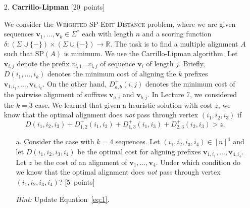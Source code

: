 \begin{enumerate}
\item[2.] \textbf{Carrillo-Lipman} [20~points]

We consider the \textsc{Weighted SP-Edit Distance} problem, where we are given sequences $\mathbf{v}_1,\ldots,\mathbf{v}_k \in \Sigma^*$ each with length $n$ and a scoring function $\delta : (\Sigma \cup \{-\}) \times (\Sigma \cup \{-\}) \rightarrow \mathbb{R}$. 
The task is to find a multiple alignment $A$ such that $\mathrm{SP}(A)$ is minimum.
We use the Carrillo-Lipman algorithm. 
Let $\mathbf{v}_{i,j}$ denote the prefix $v_{i,1}\ldots v_{i,j}$ of sequence $\mathbf{v}_i$ of length $j$.
Briefly, $D(i_1,\ldots,i_k)$ denotes the minimum cost of aligning the $k$ prefixes $\mathbf{v}_{1,i_1},\ldots,\mathbf{v}_{k,i_k}$. 
On the other hand, $D^+_{a,b}(i,j)$ denotes the minimum cost of the pairwise alignment of suffixes $\mathbf{v}_{a,i}$ and $\mathbf{v}_{b,j}$.
In Lecture 7, we considered the $k=3$ case. 
We learned that given a heuristic solution with cost $z$, we know that the optimal alignment does \emph{not} pass through vertex $(i_1,i_2,i_3)$ if 
\begin{equation}
\label{eq:1}
  D(i_1,i_2,i_3) + D^+_{1,2}(i_1,i_2) + D^+_{1,3}(i_1,i_3) + D^+_{2,3}(i_2,i_3) > z.
\end{equation}

\begin{itemize}
    \item[a.] Consider the case with $k=4$ sequences. Let $(i_1,i_2,i_3,i_4) \in [n]^4$ and let $D(i_1,i_2,i_3,i_4)$ be the optimal cost for aligning prefixes $\mathbf{v}_{1,i_1},\ldots,\mathbf{v}_{4,i_4}$. Let $z$ be the cost of an alignment of $\mathbf{v}_1,\ldots,\mathbf{v}_4$. Under which condition do we know that the optimal alignment does \emph{not} pass through vertex $(i_1,i_2,i_3,i_4)$? [5~points]
    
    \emph{Hint:} Update Equation~\eqref{eq:1}.
    
    

\end{itemize}
\end{enumerate}
